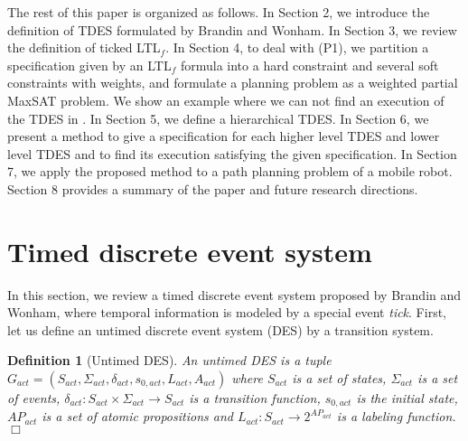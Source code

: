 \documentclass[journal,twoside,web]{IEEEtran}
\newcommand{\qedwhite}{\hfill \ensuremath{\Box}}
\newtheorem{dfn}{Definition}
\begin{document}
%
%
The rest of this paper is organized as follows.
In Section 2, we introduce the definition of TDES formulated by Brandin and Wonham\cite{BW1994}.
In Section 3, we review the definition of ticked LTL$_f$.
In Section 4, to deal with (P1), we partition a specification given by an LTL$_f$ formula into a hard constraint and several soft constraints with weights, and formulate a planning problem as a weighted partial MaxSAT problem.
We show an example where we can not find an execution of the TDES in \cite{KHU2020}.
In Section 5, we define a hierarchical TDES.
In Section 6, we present a method to give a specification for each higher level TDES and lower level TDES and to find its execution satisfying the given specification.
In Section 7, we apply the proposed method to a path planning problem of a mobile robot. 
Section 8 provides a summary of the paper and future research directions.
%
%
\section{Timed discrete event system}\label{tdes}
%
In this section, we review a timed discrete event system proposed by Brandin and Wonham\cite{BW1994}, where temporal information is modeled by a special event {\sl tick}. First, let us define an untimed discrete event system (DES) by a transition system.
%
\begin{dfn}[Untimed DES] \label{def:G_act}
An untimed DES is a tuple $G_{act}=(S_{act}, \Sigma_{act}, \delta_{act}, s_{0,act}, L_{act}, A_{act})$ where $S_{act}$ is a set of states, $\Sigma_{act}$ is a set of events, $\delta_{act} : S_{act} \times \Sigma_{act} \rightarrow S_{act}$ is a transition function, $s_{0,act}$ is the initial state, $AP_{act}$ is a set of atomic propositions and $L_{act} : S_{act} \rightarrow 2^{AP_{act}}$ is a labeling function. \qedwhite
\end{dfn}
\end{document}
